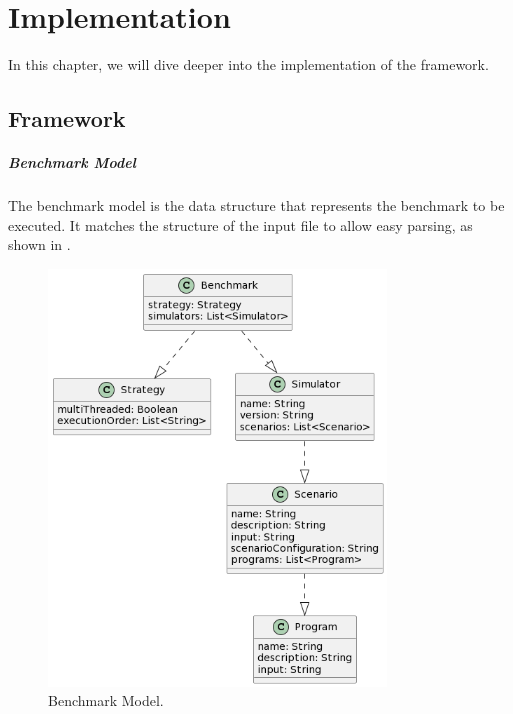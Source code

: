 \documentclass[12pt,a4paper,openright,twoside]{book}
\begin{document}
\chapter{Implementation}
\label{ch:implementation}

In this chapter, we will dive deeper into the implementation of the framework.

\section{Framework}

\paragraph*{Benchmark Model}
The benchmark model is the data structure that represents the benchmark to be executed.
It matches the structure of the input file to allow easy parsing, as shown in .

\begin{figure}[h!]
  \centering
  \includegraphics[width=0.8\textwidth]{figures/benchmark-model.png}
  \caption{Benchmark Model.}
  \label{fig:benchmark-model}
\end{figure}
\end{document}

